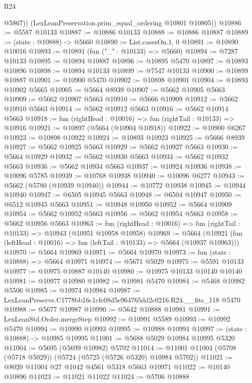 \begin{lexlean}{R24}
\begin{coremodule}
          @5867))
      (LexLeanPreservation.prim_equal_ordering @10801 @10805))
@10886 := @5587 @10133
@10887 := @10886 @10133
@10888 := @10886 @10887
@10889 := (state : @10888) -> @5660
@10890 := List.casesOn.{1, 0}
@10891 := @10890 @10016
@10893 := @10891 (fun ("_" : @10133) => @5660)
@10894 := @7287 @10133
@10895 := @10894 @10887
@10896 := @10895 @5470
@10897 := @10893 @10896
@10898 := @10894 @10133
@10899 := @7547 @10133
@10900 := @10899 @10887
@10901 := @10900 @5470
@10902 := @10898 @10901
@10904 := @10893 @10902 @5665
@10905 := @5664 @8939
@10907 := @5662 @10905 @5663
@10909 := @5662 @10907 @5663
@10910 := @5666 @10909
@10912 := @5662 @10910 @5663
@10914 := @5662 @10912 @5663
@10916 := @5662 @10914 @5663
@10918 := fun (rightHead : @10016) => fun (rightTail : @10133) => @10916
@10921 := @10897 (@5664 (@10904 @10918))
@10922 := @10900 @6267
@10923 := @10898 @10922
@10924 := @10893 @10923
@10925 := @5666 @8939
@10927 := @5662 @10925 @5663
@10929 := @5662 @10927 @5663
@10930 := @5664 @10929
@10932 := @5662 @10930 @5663
@10934 := @5662 @10932 @5663
@10936 := @5662 @10934 @5663
@10937 := @10924 @10936
@10938 := @10096 @5785
@10939 := @10768 @10938
@10940 := @10096 @6277
@10943 := @5662 (@5780 (@10939 @10940))
@10944 := @10772 @10938
@10945 := @10944 @10940
@10947 := @6505 @10945 @5663
@10948 := @6504 @10947
@10950 := @6512 @10945 @5663
@10951 := @10948 @10950
@10952 := @5664 @10909
@10954 := @5662 @10952 @5663
@10956 := @5662 @10954 @5663
@10958 := @5662 @10956 @5663
@10963 := fun (rightHead : @10016) => fun (rightTail : @10133) => @10943 (@10951 @10958 @10958)
@10969 := @5664
    (@10921 (fun (leftHead : @10016) => fun (leftTail : @10133) => @5664 (@10937 @10963)))
@10970 := @5664 @10969
@10971 := @5664 @10970
@10973 := fun (state : @10888) => @5664 @10971
@10974 := @5671 @5029
@10975 := @5591 @10133
@10977 := @10975 @10887 @10140
@10980 := @10975 @10133 @10140 @10140
@10981 := @10977 @10980
@10982 := @10981 @5470
@10984 := @5468 @10982 @5506
@10985 := @10974 @10984
@10987 := LexLeanPreserve.C1778bb16c1cfe08d5e964765dd2c0216.R24.__fits_118 @5470
@10988 := @5677 @10987
@10990 := @5642 @10888 @10981
@10991 := LexLeanStd.Order.mergeStep
@10992 := @10991 @5589
@10993 := @10992 @5470
@10994 := @10990 @10993
@10995 := @10988 @10994
@10997 := (state : @10888) -> @10985 @10995
@11001 := @5688 @5029 @10984 @10995 @5320
@11004 := @5695 (@5699 @10982) @5702
@11014 := @11001 @11004 (@5708 (@5718 @5029)) (@5724 (@5725 (@5726 @5320) @10984 @5702))
@11021 := @8020 @11004 @27 @1042 @4561 @5318 @5663 @10971
@11022 := @10140 @10896
@11023 := @11021 @11022
@11024 := @5706 @10888

\end{coremodule}
\end{lexlean}
